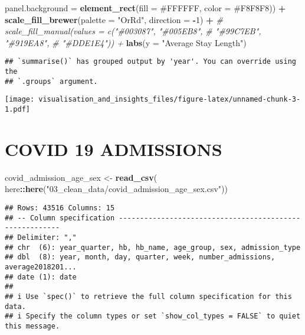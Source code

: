 \documentclass[
]{article}
\newenvironment{Shaded}{\begin{snugshade}}{\end{snugshade}}
\newcommand{\AttributeTok}[1]{\textcolor[rgb]{0.13,0.29,0.53}{#1}}
\newcommand{\CommentTok}[1]{\textcolor[rgb]{0.56,0.35,0.01}{\textit{#1}}}
\newcommand{\DecValTok}[1]{\textcolor[rgb]{0.00,0.00,0.81}{#1}}
\newcommand{\FunctionTok}[1]{\textcolor[rgb]{0.13,0.29,0.53}{\textbf{#1}}}
\newcommand{\NormalTok}[1]{#1}
\newcommand{\OtherTok}[1]{\textcolor[rgb]{0.56,0.35,0.01}{#1}}
\newcommand{\SpecialCharTok}[1]{\textcolor[rgb]{0.81,0.36,0.00}{\textbf{#1}}}
\newcommand{\StringTok}[1]{\textcolor[rgb]{0.31,0.60,0.02}{#1}}
\begin{document}
\begin{Shaded}
\begin{Highlighting}[]
        \AttributeTok{panel.background =} \FunctionTok{element\_rect}\NormalTok{(}\AttributeTok{fill =} \StringTok{\textquotesingle{}\#FFFFFF\textquotesingle{}}\NormalTok{, }
                                        \AttributeTok{color =} \StringTok{\textquotesingle{}\#F8F8F8\textquotesingle{}}\NormalTok{)) }\SpecialCharTok{+}
      \FunctionTok{scale\_fill\_brewer}\NormalTok{(}\AttributeTok{palette =} \StringTok{"OrRd"}\NormalTok{, }\AttributeTok{direction =} \SpecialCharTok{{-}}\DecValTok{1}\NormalTok{) }\SpecialCharTok{+}
      \CommentTok{\# scale\_fill\_manual(values = c("\#003087", "\#005EB8", }
      \CommentTok{\#                              "\#99C7EB", "\#919EA8", }
      \CommentTok{\#                              "\#DDE1E4")) +}
      \FunctionTok{labs}\NormalTok{(}\AttributeTok{y =} \StringTok{"Average Stay Length"}\NormalTok{)}
\end{Highlighting}
\end{Shaded}

\begin{verbatim}
## `summarise()` has grouped output by 'year'. You can override using the
## `.groups` argument.
\end{verbatim}

\texttt{[image: visualisation\_and\_insights\_files/figure-latex/unnamed-chunk-3-1.pdf]}

\hypertarget{covid-19-admissions}{%
\section{COVID 19 ADMISSIONS}\label{covid-19-admissions}}

\begin{Shaded}
\begin{Highlighting}[]
\NormalTok{covid\_admission\_age\_sex }\OtherTok{\textless{}{-}} \FunctionTok{read\_csv}\NormalTok{(}
\NormalTok{  here}\SpecialCharTok{::}\FunctionTok{here}\NormalTok{(}\StringTok{"03\_clean\_data/covid\_admission\_age\_sex.csv"}\NormalTok{))}
\end{Highlighting}
\end{Shaded}

\begin{verbatim}
## Rows: 43516 Columns: 15
## -- Column specification --------------------------------------------------------
## Delimiter: ","
## chr  (6): year_quarter, hb, hb_name, age_group, sex, admission_type
## dbl  (8): year, month, day, quarter, week, number_admissions, average2018201...
## date (1): date
## 
## i Use `spec()` to retrieve the full column specification for this data.
## i Specify the column types or set `show_col_types = FALSE` to quiet this message.
\end{verbatim}
\end{document}
